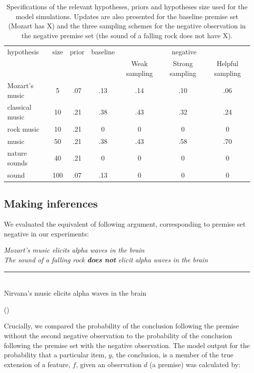 \documentclass[authoryear,11pt]{elsarticle}
\newcounter{quotecount}
\newcommand{\MyQuote}[1]{\vspace{.5cm}\addtocounter{quotecount}{1}%
     \parbox{13cm}{\em #1}\hspace*{1cm}(\arabic{quotecount})\\[0cm]\vspace{.5cm}}
\begin{document}
\begin{table}[H]
\begin{center}
\scriptsize
\caption{\small Specifications of the relevant hypotheses, priors and hypotheses size used for the model simulations. Updates are also presented for the {\sc baseline} premise set (Mozart has X) and the three sampling schemes for the negative observation in the {\sc negative} premise set (the sound of a falling rock does not have X).\normalsize}
\label{table:Hsettings}
\begin{tabular}{lcc||c|ccc}
\hline
hypothesis & size & prior & {\sc baseline} &\multicolumn{3}{c}{{\sc negative}}\\
& & & & Weak sampling & Strong sampling & Helpful sampling \\
\hline
Mozart's music & 5 & .07  &.13	&	.14	&.10	&.06	\\
classical music & 10 & .21&.38	&	.43	&.32	&.24	\\
rock music & 10 & .21			&0 		&	0		&	0		&0\\
music & 50 & .21					&.38	&	.43	&	.58	&.70\\
nature sounds & 40 & .21	&0		&	0		&	0		&0\\
sound & 100 & .07					&.13	&	0		&	0		&0\\
\hline
\end{tabular}
\end{center}
\end{table}

\subsection*{Making inferences}

We evaluated the equivalent of following argument, corresponding to premise set {\sc negative} in our experiments:

\MyQuote{Mozart's music elicits alpha waves in the brain\\
The sound of a falling rock \textbf{does not} elicit alpha waves in the brain\\[-5pt]
\rule[0pt]{250pt}{1pt} \\[-2pt]
Nirvana's music elicits alpha waves in the brain
}

Crucially, we compared the probability of the conclusion following the premise without the second negative observation to the probability of the conclusion following the premise set with the negative observation. The model output for the probability that a particular item, $y$, the conclusion, is a member of the true extension of a feature, $f$, given an observation $d$ (a premise) was calculated by:
\end{document}
